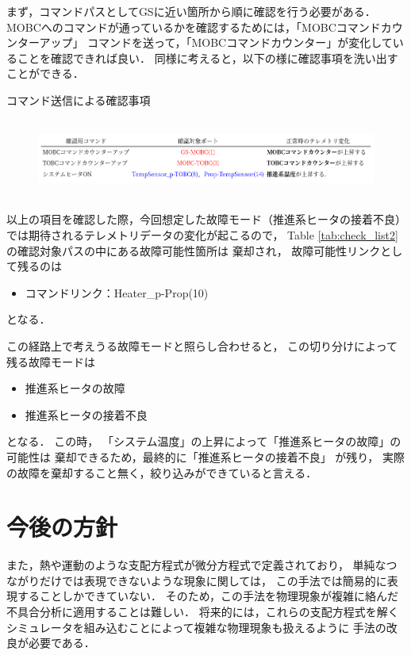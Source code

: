 \documentclass[11pt]{article}
\begin{document}
まず，コマンドパスとしてGSに近い箇所から順に確認を行う必要がある．
MOBCへのコマンドが通っているかを確認するためには，「MOBCコマンドカウンターアップ」
コマンドを送って，「MOBCコマンドカウンター」が変化していることを確認できれば良い．
同様に考えると，以下の様に確認事項を洗い出すことができる．
\begin{table}[H]
   \centering
   \caption{コマンド送信による確認事項} 
   \label{tab:check_list2}
\end{table}
\vspace{-2zh}
\begin{figure}[H]
   \centering
      \includegraphics[height=2.6cm]{figure/check_list.png}
\end{figure}
以上の項目を確認した際，今回想定した故障モード（推進系ヒータの接着不良）
では期待されるテレメトリデータの変化が起こるので，
Table \ref{tab:check_list2}の確認対象パスの中にある故障可能性箇所は
棄却され，
故障可能性リンクとして残るのは
\begin{itemize}
   \item コマンドリンク：Heater\_p-Prop(10)
\end{itemize}
となる．


この経路上で考えうる故障モードと照らし合わせると，
この切り分けによって残る故障モードは
\begin{itemize}
   \item 推進系ヒータの故障
   \item 推進系ヒータの接着不良
\end{itemize}
となる．
この時，
「システム温度」の上昇によって「推進系ヒータの故障」の可能性は
棄却できるため，最終的に「推進系ヒータの接着不良」
が残り，
実際の故障を棄却すること無く，絞り込みができていると言える．\\

\section{今後の方針}

また，熱や運動のような支配方程式が微分方程式で定義されており，
単純なつながりだけでは表現できないような現象に関しては，
この手法では簡易的に表現することしかできていない．
そのため，この手法を物理現象が複雑に絡んだ不具合分析に適用することは難しい．
将来的には，これらの支配方程式を解く
シミュレータを組み込むことによって複雑な物理現象も扱えるように
手法の改良が必要である．


 
\end{document}
